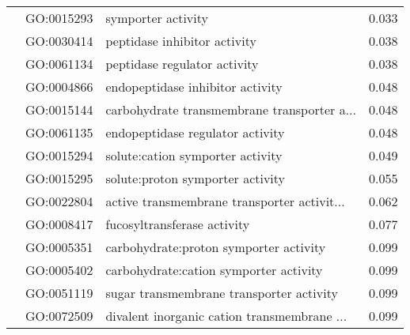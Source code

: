 \begin{longtable}{lllr}
   & GO:0015293 &                           symporter activity &         0.033 \\
   & GO:0030414 &                 peptidase inhibitor activity &         0.038 \\
   & GO:0061134 &                 peptidase regulator activity &         0.038 \\
   & GO:0004866 &             endopeptidase inhibitor activity &         0.048 \\
   & GO:0015144 &  carbohydrate transmembrane transporter a... &         0.048 \\
   & GO:0061135 &             endopeptidase regulator activity &         0.048 \\
   & GO:0015294 &             solute:cation symporter activity &         0.049 \\
   & GO:0015295 &             solute:proton symporter activity &         0.055 \\
   & GO:0022804 &  active transmembrane transporter activit... &         0.062 \\
   & GO:0008417 &                  fucosyltransferase activity &         0.077 \\
   & GO:0005351 &       carbohydrate:proton symporter activity &         0.099 \\
   & GO:0005402 &       carbohydrate:cation symporter activity &         0.099 \\
   & GO:0051119 &     sugar transmembrane transporter activity &         0.099 \\
   & GO:0072509 &  divalent inorganic cation transmembrane ... &         0.099 \\
\end{longtable}
